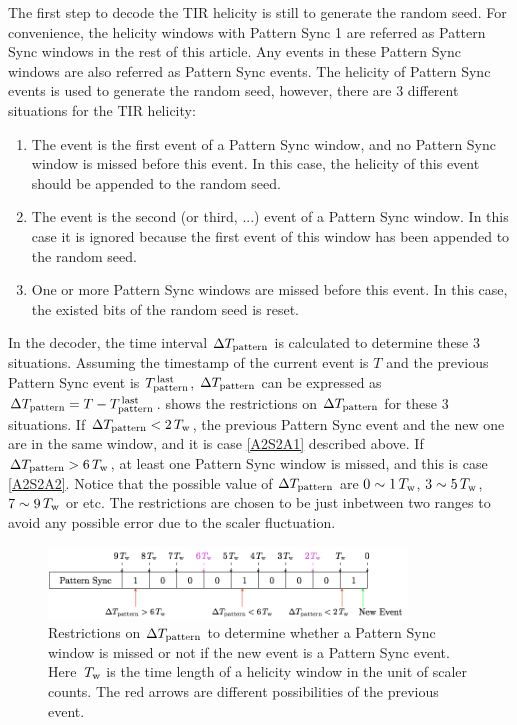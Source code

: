 The first step to decode the TIR helicity is still to generate the random seed. For convenience, the helicity windows with Pattern Sync 1 are referred as Pattern Sync windows in the rest of this article. Any events in these Pattern Sync windows are also referred as Pattern Sync events. The helicity of Pattern Sync events is used to generate the random seed, however, there are 3 different situations for the TIR helicity:
\begin{enumerate}[parsep=0pt]
\item \label{A2S2A1} The event is the first event of a Pattern Sync window, and no Pattern Sync window is missed before this event. In this case, the helicity of this event should be appended to the random seed.
\item The event is the second (or third, ...) event of a Pattern Sync window. In this case it is ignored because the first event of this window has been appended to the random seed.
\item \label{A2S2A2} One or more Pattern Sync windows are missed before this event. In this case, the existed bits of the random seed is reset.
\end{enumerate}
In the decoder, the time interval $\Delta T_{\text{pattern}}$ is calculated to determine these 3 situations. Assuming the timestamp of the current event is $T$ and the previous Pattern Sync event is $T^{\,\text{last}}_{\text{pattern}}$, $\Delta T_{\text{pattern}}$ can be expressed as $\Delta T_{\text{pattern}}=T-T^{\,\text{last}}_{\text{pattern}}$.  shows the restrictions on $\Delta T_{\text{pattern}}$ for these 3 situations. If $\Delta T_{\text{pattern}}<2\,T_{\text{w}}$, the previous Pattern Sync event and the new one are in the same window, and it is case \ref{A2S2A1} described above. If $\Delta T_{\text{pattern}}>6\,T_{\text{w}}$, at least one Pattern Sync window is missed, and this is case \ref{A2S2A2}. Notice that the possible value of $\Delta T_{\text{pattern}}$ are $0\sim1\,T_{\text{w}}$, $3\sim5\,T_{\text{w}}$, $7\sim9\,T_{\text{w}}$ or etc. The restrictions are chosen to be just inbetween two ranges to avoid any possible error due to the scaler fluctuation.

\begin{figure}[tb!]
  \centering
  \includegraphics[width=0.85\textwidth]{figs/tir-helicity-seed.png}
  \caption[Determine the radom seed for TIR helicity.]{Restrictions on $\Delta T_{\text{pattern}}$ to determine whether a Pattern Sync window is missed or not if the new event is a Pattern Sync event. Here $\,T_{\text{w}}$ is the time length of a helicity window in the unit of scaler counts. The red arrows are different possibilities of the previous event. \label{A2S2F4}}
\end{figure}

